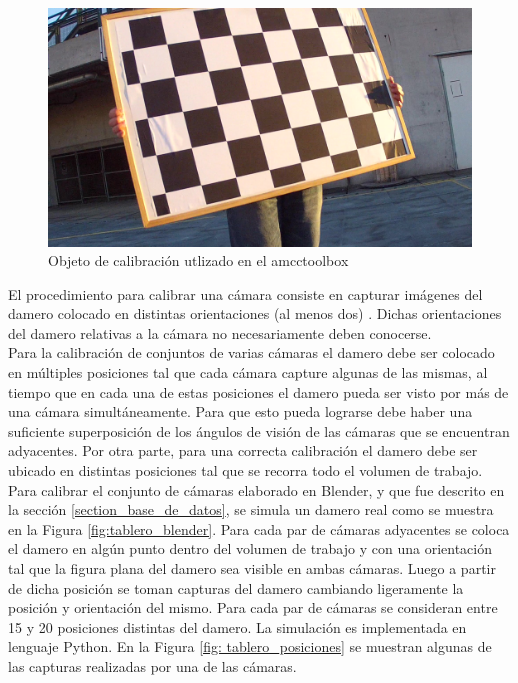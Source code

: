 \begin{figure}[ht!]
\begin{center}
\includegraphics[scale=0.075]{img/calibracion/tablero.jpg}
\end{center}

\caption{Objeto de calibración utlizado en el amcctoolbox}
\label{fig: tablero}
\end{figure}


El procedimiento para calibrar una cámara consiste en capturar imágenes del damero colocado en distintas orientaciones (al menos dos) \cite{zhang_articulo}. Dichas orientaciones del damero relativas a la cámara no necesariamente deben conocerse.\\

Para la calibración de conjuntos de varias cámaras el damero debe ser colocado en múltiples posiciones tal que cada cámara capture algunas de las mismas, al tiempo que en cada una de estas posiciones el damero pueda ser visto por más de una cámara simultáneamente. Para que esto pueda lograrse debe haber una suficiente superposición de los ángulos de visión de las cámaras que se encuentran adyacentes. Por otra parte, para una correcta calibración el damero debe ser ubicado en distintas posiciones tal que se recorra todo el volumen de trabajo.\\

Para calibrar el conjunto de cámaras elaborado en Blender, y que fue descrito en la sección \ref{section_base_de_datos}, se simula un damero real como se muestra en la Figura \ref{fig:tablero_blender}. Para cada par de cámaras adyacentes se coloca el damero en algún punto dentro del volumen de trabajo y con una orientación tal que la figura plana del damero sea visible en ambas cámaras. Luego a partir de dicha posición se toman capturas del damero cambiando ligeramente la posición y orientación del mismo. Para cada par de cámaras se consideran entre 15 y 20 posiciones distintas del damero. La simulación es implementada en lenguaje Python.  En la Figura \ref{fig: tablero_posiciones} se muestran algunas de las capturas realizadas por una de las cámaras. 




